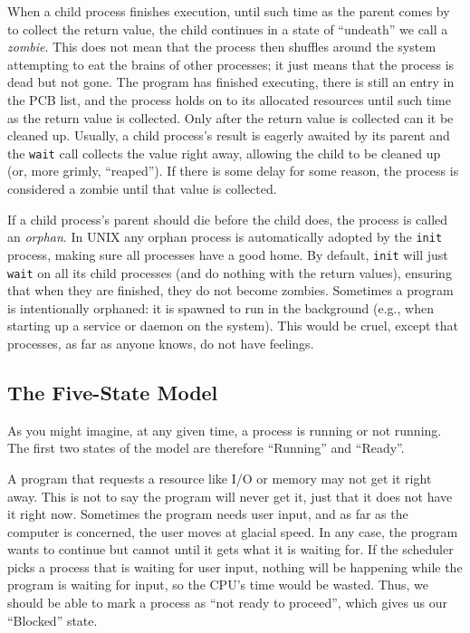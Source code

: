 \documentclass[a4paper]{report}
\begin{document}
When a child process finishes execution, until such time as the parent comes by to collect the return value, the child continues in a state of ``undeath'' we call a \textit{zombie}. This does not mean that the process then shuffles around the system attempting to eat the brains of other processes; it just means that the process is dead but not gone. The program has finished executing, there is still an entry in the PCB list, and the process holds on to its allocated resources until such time as the return value is collected. Only after the return value is collected can it be cleaned up. Usually, a child process's result is eagerly awaited by its parent and the \texttt{wait} call collects the value right away, allowing the child to be cleaned up (or, more grimly, ``reaped''). If there is some delay for some reason, the process is considered a zombie until that value is collected.

If a child process's parent should die before the child does, the process is called an \textit{orphan}. In UNIX any orphan process is automatically adopted by the \texttt{init} process, making sure all processes have a good home. By default, \texttt{init} will just \texttt{wait} on all its child processes (and do nothing with the return values), ensuring that when they are finished, they do not become zombies. Sometimes a program is intentionally orphaned: it is spawned to run in the background (e.g., when starting up a service or daemon on the system). This would be cruel, except that processes, as far as anyone knows, do not have feelings.

\subsection*{The Five-State Model}

As you might imagine, at any given time, a process is running or not running. The first two states of the model are therefore ``Running'' and ``Ready''.

A program that requests a resource like I/O or memory may not get it right away. This is not to say the program will never get it, just that it does not have it right now. Sometimes the program needs user input, and as far as the computer is concerned, the user moves at glacial speed. In any case, the program wants to continue but cannot until it gets what it is waiting for.  If the scheduler picks a process that is waiting for user input, nothing will be happening while the program is waiting for input, so the CPU's time would be wasted. Thus, we should be able to mark a process as ``not ready to proceed'', which gives us our ``Blocked'' state.
\end{document}
